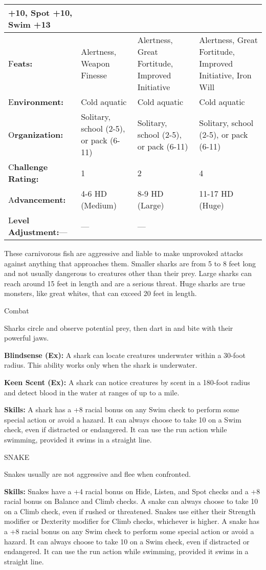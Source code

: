 \documentclass{article}
\begin{document}
\begin{tabular}{|>{\raggedright}p{53pt}|>{\raggedright}p{82pt}|>{\raggedright}p{82pt}|>{\raggedright}p{82pt}|}
+10, Spot +10, Swim +13\tabularnewline
\hline
F\textbf{eats:} & Alertness, Weapon Finesse & Alertness, Great Fortitude, Improved 
Initiative & Alertness, Great Fortitude, Improved Initiative, Iron Will\tabularnewline
\hline
E\textbf{nvironment:} & Cold aquatic & Cold aquatic & Cold aquatic\tabularnewline
\hline
O\textbf{rganization:} & Solitary, school (2-5), or pack (6-11) & Solitary, school 
(2-5), or pack (6-11) & Solitary, school (2-5), or pack (6-11)\tabularnewline
\hline
C\textbf{hallenge Rating:} & 1 & 2 & 4\tabularnewline
\hline
A\textbf{dvancement:} & 4-6 HD (Medium) & 8-9 HD (Large) & 11-17 HD (Huge)\tabularnewline
\hline
L\textbf{evel Adjustment:}--- & --- & --- & \tabularnewline
\hline
\end{tabular}

These carnivorous fish are aggressive and liable to make unprovoked attacks against 
anything that approaches them. Smaller sharks are from 5 to 8 feet long and not 
usually dangerous to creatures other than their prey. Large sharks can reach around 
15 feet in length and are a serious threat. Huge sharks are true monsters, like 
great whites, that can exceed 20 feet in length.

Combat

Sharks circle and observe potential prey, then dart in and bite with their powerful 
jaws.

\textbf{Blindsense (Ex): }A shark can locate creatures underwater within a 30-foot 
radius. This ability works only when the shark is underwater.

\textbf{Keen Scent (Ex): }A shark can notice creatures by scent in a 180-foot radius 
and detect blood in the water at ranges of up to a mile. 

\textbf{Skills:} A shark has a +8 racial bonus on any Swim check to perform some 
special action or avoid a hazard. It can always choose to take 10 on a Swim check, 
even if distracted or endangered. It can use the run action while swimming, provided 
it swims in a straight line. 

\vspace{12pt}
SNAKE

Snakes usually are not aggressive and flee when confronted.

\textbf{Skills:} Snakes have a +4 racial bonus on Hide, Listen, and Spot checks 
and a +8 racial bonus on Balance and Climb checks. A snake can always choose to 
take 10 on a Climb check, even if rushed or threatened. Snakes use either their 
Strength modifier or Dexterity modifier for Climb checks, whichever is higher. 
A snake has a +8 racial bonus on any Swim check to perform some special action 
or avoid a hazard. It can always choose to take 10 on a Swim check, even if distracted 
or endangered. It can use the run action while swimming, provided it swims in a 
straight line.
\end{document}
